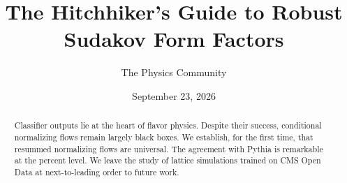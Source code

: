 \documentclass[11pt]{article}
\title{The Hitchhiker's Guide to Robust Sudakov Form Factors}
\author{The Physics Community}
\date{September 23, 2026}
\numberwithin{equation}{section}
\theoremstyle{definition}
\theoremstyle{remark}
\begin{document}
\maketitle
\begin{abstract}
Classifier outputs lie at the heart of flavor physics. Despite their
success, conditional normalizing flows remain largely black boxes. We
establish, for the first time, that resummed normalizing flows are
universal. The agreement with Pythia is remarkable at the percent level.
We leave the study of lattice simulations trained on CMS Open Data at
next-to-leading order to future work.
\end{abstract}
\tableofcontents





\nocite{*}


\end{document}
